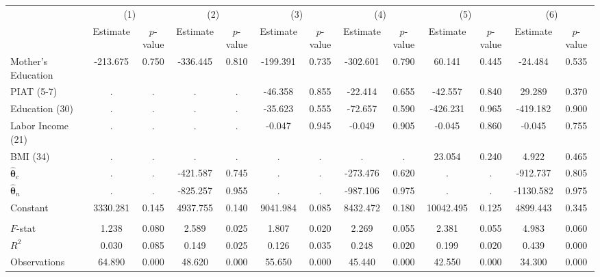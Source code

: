 \begin{tabular}{lcccccccccccc} \toprule
 & \multicolumn{2}{c}{(1)}  &  \multicolumn{2}{c}{(2)}  &  \multicolumn{2}{c}{(3)}  &  \multicolumn{2}{c}{(4)}  & \multicolumn{2}{c}{(5)} & \multicolumn{2}{c}{(6)} \\  
 & Estimate & $p$-value & Estimate & $p$-value & Estimate & $p$-value & Estimate & $p$-value & Estimate & $p$-value & Estimate & $p$-value \\ \midrule
Mother's Education &  -213.675 &     0.750 &  -336.445 &     0.810 &  -199.391 &     0.735 &  -302.601 &     0.790 &    60.141 &     0.445 &   -24.484 &     0.535 \\  
PIAT (5-7) &         . &         . &         . &         . &   -46.358 &     0.855 &   -22.414 &     0.655 &   -42.557 &     0.840 &    29.289 &     0.370 \\  
Education (30) &         . &         . &         . &         . &   -35.623 &     0.555 &   -72.657 &     0.590 &  -426.231 &     0.965 &  -419.182 &     0.900 \\  
Labor Income (21) &         . &         . &         . &         . &    -0.047 &     0.945 &    -0.049 &     0.905 &    -0.045 &     0.860 &    -0.045 &     0.755 \\  
BMI (34) &         . &         . &         . &         . &         . &         . &         . &         . &    23.054 &     0.240 &     4.922 &     0.465 \\  
$\hat{\bm{\theta}}_c$ &         . &         . &  -421.587 &     0.745 &         . &         . &  -273.476 &     0.620 &         . &         . &  -912.737 &     0.805 \\  
$\hat{\bm{\theta}}_n$ &         . &         . &  -825.257 &     0.955 &         . &         . &  -987.106 &     0.975 &         . &         . & -1130.582 &     0.975 \\  
Constant &  3330.281 &     0.145 &  4937.755 &     0.140 &  9041.984 &     0.085 &  8432.472 &     0.180 & 10042.495 &     0.125 &  4899.443 &     0.345 \\  \\ \midrule
$F$-stat &     1.238 &     0.080 &     2.589 &     0.025 &     1.807 &     0.020 &     2.269 &     0.055 &     2.381 &     0.055 &     4.983 &     0.060 \\  
$R^2$ &     0.030 &     0.085 &     0.149 &     0.025 &     0.126 &     0.035 &     0.248 &     0.020 &     0.199 &     0.020 &     0.439 &     0.000 \\  
Observations &    64.890 &     0.000 &    48.620 &     0.000 &    55.650 &     0.000 &    45.440 &     0.000 &    42.550 &     0.000 &    34.300 &     0.000 \\  
\bottomrule \end{tabular}
